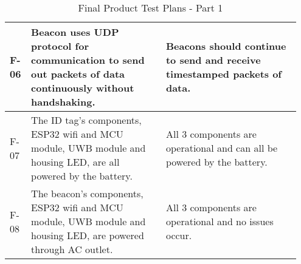 \begin{table}[h!]
\begin{tabular}{|m{0.05\linewidth}|m{0.45\linewidth}|m{0.45\linewidth}|}
    F-06
    & Beacon uses UDP protocol for communication to send out packets of data continuously without handshaking.
    & Beacons should continue to send and receive timestamped packets of data.  \\ 
    \hline

    F-07 
    & The ID tag's components, ESP32 wifi and MCU module, UWB module and housing LED, are all powered by the battery.
    & All 3 components are operational and can all be powered by the battery.  \\ 
    \hline
    
    F-08 
    & The beacon's components, ESP32 wifi and MCU module, UWB module and housing LED, are powered through AC outlet.
    & All 3 components are operational and no issues occur.  \\ 
    \hline

\end{tabular}
    \caption{Final Product Test Plans - Part 1}
\end{table}

\pagebreak


